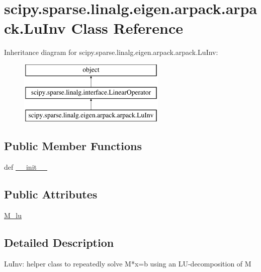 \hypertarget{classscipy_1_1sparse_1_1linalg_1_1eigen_1_1arpack_1_1arpack_1_1LuInv}{}\section{scipy.\+sparse.\+linalg.\+eigen.\+arpack.\+arpack.\+Lu\+Inv Class Reference}
\label{classscipy_1_1sparse_1_1linalg_1_1eigen_1_1arpack_1_1arpack_1_1LuInv}
Inheritance diagram for scipy.\+sparse.\+linalg.\+eigen.\+arpack.\+arpack.\+Lu\+Inv\+:\begin{figure}[H]
\begin{center}
\leavevmode
\includegraphics[height=3.000000cm]{classscipy_1_1sparse_1_1linalg_1_1eigen_1_1arpack_1_1arpack_1_1LuInv}
\end{center}
\end{figure}
\subsection*{Public Member Functions}
\begin{DoxyCompactItemize}
\item 
def \hyperlink{classscipy_1_1sparse_1_1linalg_1_1eigen_1_1arpack_1_1arpack_1_1LuInv_ae0c8b40903079f63ecd084ce409edf0b}{\+\_\+\+\_\+init\+\_\+\+\_\+}
\end{DoxyCompactItemize}
\subsection*{Public Attributes}
\begin{DoxyCompactItemize}
\item 
\hyperlink{classscipy_1_1sparse_1_1linalg_1_1eigen_1_1arpack_1_1arpack_1_1LuInv_a34f0a1eb1401af2d0973cf421fd85d0d}{M\+\_\+lu}
\end{DoxyCompactItemize}


\subsection{Detailed Description}
\begin{DoxyVerb}LuInv:
   helper class to repeatedly solve M*x=b
   using an LU-decomposition of M
\end{DoxyVerb}
 

